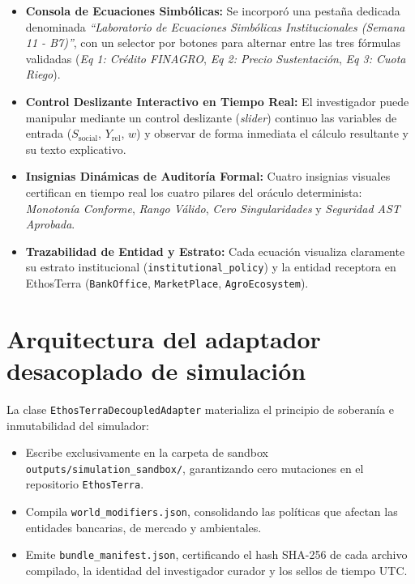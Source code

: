 \documentclass[11pt,a4paper]{article}
\begin{document}
\begin{itemize}[leftmargin=*]
    \item \textbf{Consola de Ecuaciones Simb\'olicas:} Se incorpor\'o una pesta\~na dedicada denominada \textit{``Laboratorio de Ecuaciones Simb\'olicas Institucionales (Semana 11 - B7)''}, con un selector por botones para alternar entre las tres f\'ormulas validadas (\textit{Eq 1: Cr\'edito FINAGRO}, \textit{Eq 2: Precio Sustentaci\'on}, \textit{Eq 3: Cuota Riego}).
    \item \textbf{Control Deslizante Interactivo en Tiempo Real:} El investigador puede manipular mediante un control deslizante (\textit{slider}) continuo las variables de entrada ($S_{\text{social}}$, $Y_{\text{rel}}$, $w$) y observar de forma inmediata el c\'alculo resultante y su texto explicativo.
    \item \textbf{Insignias Din\'amicas de Auditor\'ia Formal:} Cuatro insignias visuales certifican en tiempo real los cuatro pilares del or\'aculo determinista: \textit{Monoton\'ia Conforme}, \textit{Rango V\'alido}, \textit{Cero Singularidades} y \textit{Seguridad AST Aprobada}.
    \item \textbf{Trazabilidad de Entidad y Estrato:} Cada ecuaci\'on visualiza claramente su estrato institucional (\texttt{institutional\_policy}) y la entidad receptora en EthosTerra (\texttt{BankOffice}, \texttt{MarketPlace}, \texttt{AgroEcosystem}).
\end{itemize}

\section{Arquitectura del adaptador desacoplado de simulaci\'on}

La clase \texttt{EthosTerraDecoupledAdapter} materializa el principio de soberan\'ia e inmutabilidad del simulador:
\begin{itemize}[leftmargin=*]
    \item Escribe exclusivamente en la carpeta de sandbox \texttt{outputs/simulation\_sandbox/}, garantizando cero mutaciones en el repositorio \texttt{EthosTerra}.
    \item Compila \texttt{world\_modifiers.json}, consolidando las pol\'iticas que afectan las entidades bancarias, de mercado y ambientales.
    \item Emite \texttt{bundle\_manifest.json}, certificando el hash SHA-256 de cada archivo compilado, la identidad del investigador curador y los sellos de tiempo UTC.
\end{itemize}
\end{document}
